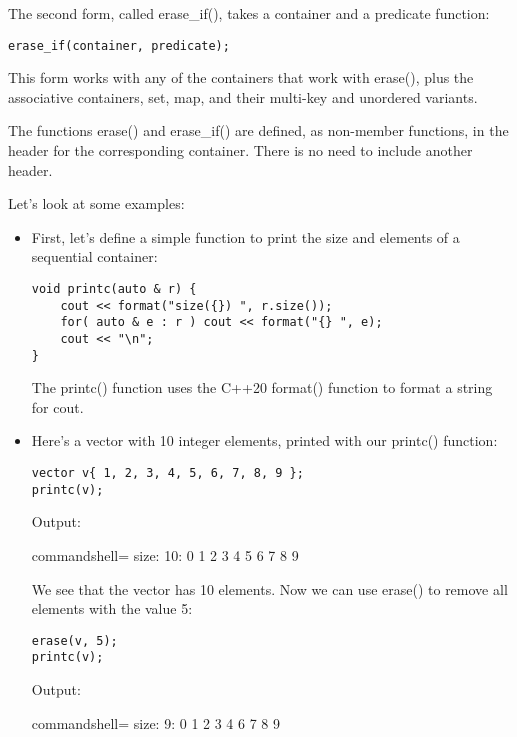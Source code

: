 The second form, called erase\_if(), takes a container and a predicate function:

\begin{lstlisting}[style=styleCXX]
erase_if(container, predicate);
\end{lstlisting}

This form works with any of the containers that work with erase(), plus the associative containers, set, map, and their multi-key and unordered variants.

The functions erase() and erase\_if() are defined, as non-member functions, in the header for the corresponding container. There is no need to include another header.

Let's look at some examples:

\begin{itemize}
\item 
First, let's define a simple function to print the size and elements of a sequential container:

\begin{lstlisting}[style=styleCXX]
void printc(auto & r) {
	cout << format("size({}) ", r.size());
	for( auto & e : r ) cout << format("{} ", e);
	cout << "\n";
}
\end{lstlisting}

The printc() function uses the C++20 format() function to format a string for cout.

\item 
Here's a vector with 10 integer elements, printed with our printc() function:

\begin{lstlisting}[style=styleCXX]
vector v{ 1, 2, 3, 4, 5, 6, 7, 8, 9 };
printc(v);
\end{lstlisting}

Output:

\begin{tcblisting}{commandshell={}}
size: 10: 0 1 2 3 4 5 6 7 8 9
\end{tcblisting}

We see that the vector has 10 elements. Now we can use erase() to remove all elements with the value 5:

\begin{lstlisting}[style=styleCXX]
erase(v, 5);
printc(v);
\end{lstlisting}

Output:

\begin{tcblisting}{commandshell={}}
size: 9: 0 1 2 3 4 6 7 8 9
\end{tcblisting}


\end{itemize}
